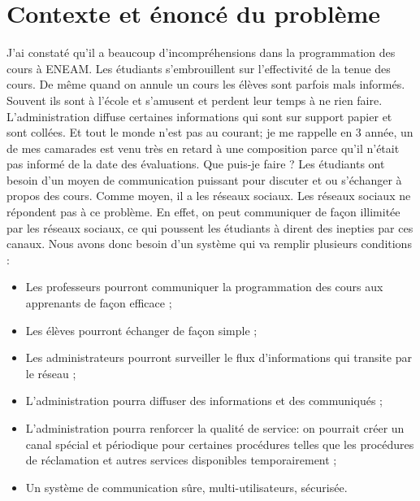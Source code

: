 \documentclass[a4paper,12pt,french]{report} %
\begin{document}
	\section{Contexte et énoncé du problème}
	J'ai constaté qu'il a beaucoup d'incompréhensions dans la programmation des cours à ENEAM. Les étudiants s'embrouillent sur l'effectivité de la tenue des cours. De même quand on annule un cours les élèves sont parfois mals informés. %
	Souvent ils sont à l'école et s'amusent et perdent leur temps à ne rien faire. L'administration diffuse certaines informations qui sont sur support papier et sont collées. Et tout le monde n'est pas au courant; je me rappelle en 3 année, un de mes camarades est venu très en retard à une composition parce qu'il n'était pas informé de la date des évaluations. Que puis-je faire ? Les étudiants ont besoin d'un moyen de communication puissant pour discuter et ou s'échanger à propos des cours. Comme moyen, il a les réseaux sociaux. Les réseaux sociaux ne répondent pas à ce problème. En effet, on peut communiquer de façon illimitée par les réseaux sociaux, ce qui poussent les étudiants à dirent des inepties par ces canaux. Nous avons donc besoin d'un système qui va remplir plusieurs conditions :
\begin{itemize}
	\item Les professeurs pourront communiquer la programmation des cours aux apprenants de façon efficace ;
	\item Les élèves pourront échanger de façon simple ;
	\item Les administrateurs pourront surveiller le flux d'informations qui transite par le réseau ;
	\item L'administration pourra diffuser des informations et des communiqués ;
	\item L'administration pourra renforcer la qualité de service: on pourrait créer un canal spécial et périodique pour certaines procédures telles que les procédures de réclamation et autres services disponibles temporairement ;
	\item Un système de communication sûre, multi-utilisateurs, sécurisée. 
\end{itemize}
\end{document}
